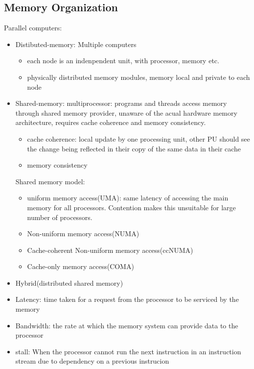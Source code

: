 \documentclass{article}
\begin{document}
\subsection{Memory Organization}
Parallel computers:
\begin{itemize}
    \item Distibuted-memory: Multiple computers
    \begin{itemize}
        \item each node is an indenpendent unit, with processor, memory etc. 
        \item physically distributed memory modules, memory local and private to each node
    \end{itemize}
    \item Shared-memory: multiprocessor: programs and threads access memory through shared memory provider, unaware of the acual hardware memory architecture, requires cache coherence and memory consistency.
    \begin{itemize}
        \item cache coherence: local update by one processing unit, other PU should see the change being reflected in their copy of the same data in their cache
        \item memory consistency
    \end{itemize}
    Shared memory model:
    \begin{itemize}
        \item uniform memory access(UMA): same latency of accessing the main memory for all processors. Contention makes this unsuitable for large number of processors. 
        \item Non-uniform memory access(NUMA)
        \item Cache-coherent Non-uniform memory access(ccNUMA)
        \item Cache-only memory access(COMA)
    \end{itemize}
    \item Hybrid(distributed shared memory)
\end{itemize}
\begin{itemize}
    \item Latency: time taken for a request from the processor to be serviced by the memory
    \item Bandwidth: the rate at which the memory system can provide data to the processor
    \item stall: When the processor cannot run the next instruction in an instruction stream due to dependency on a previous instrucion 
\end{itemize}
\end{document}
